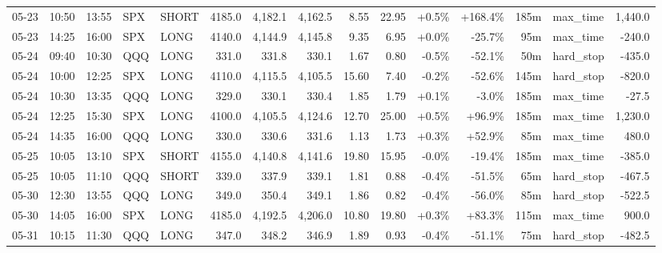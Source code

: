 \documentclass[11pt,a4paper,twoside]{article}
\begin{document}
\begin{landscape}
\begin{center}
\begin{longtable}{>{\color{txtmain}}l l l l l r r r r r r r r >{\color{txtmain}}l r}
05-23 & 10:50 & 13:55 & SPX & SHORT & 4185.0 & 4,182.1 & 4,162.5 & 8.55 & 22.95 & \textcolor{wingreen}{+0.5\%} & \textcolor{wingreen}{+168.4\%} & 185m & max\_time & \textcolor{wingreen}{1,440.0} \\
05-23 & 14:25 & 16:00 & SPX & LONG & 4140.0 & 4,144.9 & 4,145.8 & 9.35 & 6.95 & \textcolor{wingreen}{+0.0\%} & \textcolor{lossred}{-25.7\%} & 95m & max\_time & \textcolor{lossred}{-240.0} \\
05-24 & 09:40 & 10:30 & QQQ & LONG & 331.0 & 331.8 & 330.1 & 1.67 & 0.80 & \textcolor{lossred}{-0.5\%} & \textcolor{lossred}{-52.1\%} & 50m & hard\_stop & \textcolor{lossred}{-435.0} \\
05-24 & 10:00 & 12:25 & SPX & LONG & 4110.0 & 4,115.5 & 4,105.5 & 15.60 & 7.40 & \textcolor{lossred}{-0.2\%} & \textcolor{lossred}{-52.6\%} & 145m & hard\_stop & \textcolor{lossred}{-820.0} \\
05-24 & 10:30 & 13:35 & QQQ & LONG & 329.0 & 330.1 & 330.4 & 1.85 & 1.79 & \textcolor{wingreen}{+0.1\%} & \textcolor{lossred}{-3.0\%} & 185m & max\_time & \textcolor{lossred}{-27.5} \\
05-24 & 12:25 & 15:30 & SPX & LONG & 4100.0 & 4,105.5 & 4,124.6 & 12.70 & 25.00 & \textcolor{wingreen}{+0.5\%} & \textcolor{wingreen}{+96.9\%} & 185m & max\_time & \textcolor{wingreen}{1,230.0} \\
05-24 & 14:35 & 16:00 & QQQ & LONG & 330.0 & 330.6 & 331.6 & 1.13 & 1.73 & \textcolor{wingreen}{+0.3\%} & \textcolor{wingreen}{+52.9\%} & 85m & max\_time & \textcolor{wingreen}{480.0} \\
05-25 & 10:05 & 13:10 & SPX & SHORT & 4155.0 & 4,140.8 & 4,141.6 & 19.80 & 15.95 & \textcolor{lossred}{-0.0\%} & \textcolor{lossred}{-19.4\%} & 185m & max\_time & \textcolor{lossred}{-385.0} \\
05-25 & 10:05 & 11:10 & QQQ & SHORT & 339.0 & 337.9 & 339.1 & 1.81 & 0.88 & \textcolor{lossred}{-0.4\%} & \textcolor{lossred}{-51.5\%} & 65m & hard\_stop & \textcolor{lossred}{-467.5} \\
05-30 & 12:30 & 13:55 & QQQ & LONG & 349.0 & 350.4 & 349.1 & 1.86 & 0.82 & \textcolor{lossred}{-0.4\%} & \textcolor{lossred}{-56.0\%} & 85m & hard\_stop & \textcolor{lossred}{-522.5} \\
05-30 & 14:05 & 16:00 & SPX & LONG & 4185.0 & 4,192.5 & 4,206.0 & 10.80 & 19.80 & \textcolor{wingreen}{+0.3\%} & \textcolor{wingreen}{+83.3\%} & 115m & max\_time & \textcolor{wingreen}{900.0} \\
05-31 & 10:15 & 11:30 & QQQ & LONG & 347.0 & 348.2 & 346.9 & 1.89 & 0.93 & \textcolor{lossred}{-0.4\%} & \textcolor{lossred}{-51.1\%} & 75m & hard\_stop & \textcolor{lossred}{-482.5} \\

\end{longtable}
\end{center}
\end{landscape}
\end{document}
